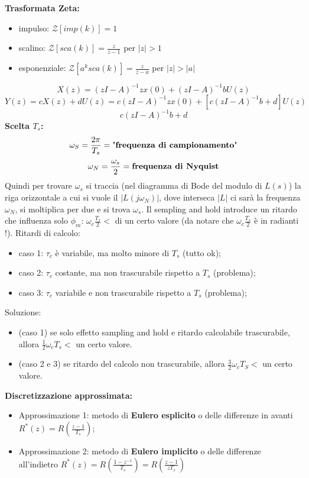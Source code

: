 \textbf{Trasformata Zeta:}
\begin{itemize}
    \item impulso: $\mathcal{Z}[imp(k)] = 1$
    \item scalino: $\mathcal{Z}[sca(k)] = \frac{z}{z-1}$ per $|z|>1$
    \item esponenziale: $\mathcal{Z}[a^k sca(k)] = \frac{z}{z-a}$ per $|z| > |a|$
\end{itemize}
\[
    X(z) = (zI-A)^{-1} z x(0) + (zI-A)^{-1} b U(z)
\]
\[
    Y(z) = cX(z) + dU(z) = c(zI-A)^{-1} z x(0) + [c(zI-A)^{-1} b + d] U(z)
\]
\[
    c(zI-A)^{-1} b + d
\]
\textbf{Scelta $T_s$:}
\[
    \omega_S =\frac{2\pi}{T_s} = \text{"\textbf{frequenza di campionamento}"}
\]
\[
    \omega_N = \frac{\omega_s}{2} = \text{\textbf{frequenza di Nyquist}}
\]
Quindi per trovare $\omega_s$ si traccia (nel diagramma di Bode del modulo di $L(s)$) la riga orizzontale a cui si vuole il $|L(j \omega_N)|$, dove interseca $|L|$ ci sarà la frequenza $\omega_N$, si moltiplica per due e si trova $\omega_s$.\newline
Il sempling and hold introduce un ritardo che influenza solo $\phi_m$: $\omega_c \frac{T_s}{2} < $ di un certo valore (da notare che $\omega_c \frac{T_s}{2}$ è in radianti !).\newline
Ritardi di calcolo:
\begin{itemize}
    \item caso 1: $\tau_c$ è variabile, ma molto minore di $T_s$ (tutto ok);
    \item caso 2: $\tau_c$ costante, ma non trascurabile rispetto a $T_s$ (problema);
    \item caso 3: $\tau_c$ variabile e non trascurabile rispetto a $T_s$ (problema);
\end{itemize}
Soluzione:
\begin{itemize}
    \item (caso 1) se solo effetto sampling and hold e ritardo calcolabile trascurabile, allora $\frac{1}{2} \omega_c T_s <$ un certo valore.
    \item (caso 2 e 3) se ritardo del calcolo non trascurabile, allora $\frac{3}{2} \omega_c T_S <$ un certo valore.
\end{itemize}
\textbf{Discretizzazione approssimata:}
\begin{itemize}
    \item Approssimazione 1: metodo di \textbf{Eulero esplicito} o delle differenze in avanti $R^*(z) = R\left(\frac{z-1}{T_s}\right)$;
    \item Approssimazione 2: metodo di \textbf{Eulero implicito} o delle differenze all'indietro $R^*(z) = R\left(\frac{1-z^{-1}}{T_s}\right) = R\left(\frac{z-1}{z T_s}\right)$
\end{itemize}
